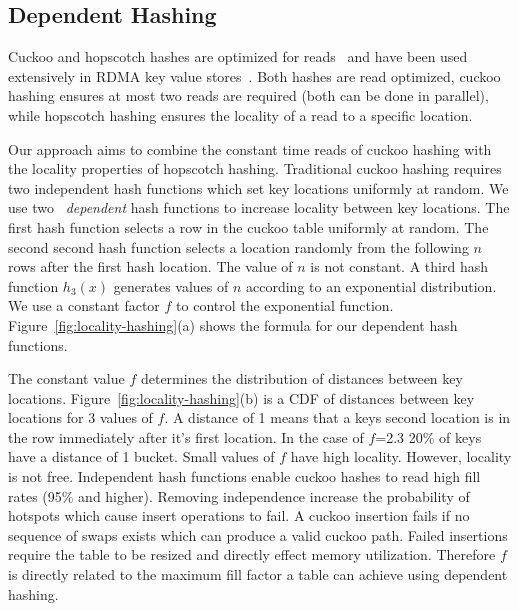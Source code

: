 \subsection{Dependent Hashing}

Cuckoo and hopscotch hashes are optimized for
reads~\cite{cuckoo,hopscotch} and have been used extensively
in RDMA key value
stores~\cite{memc3,cuckoo-improvements,pilaf,farm}. Both
hashes are read optimized, cuckoo hashing ensures at most
two reads are required (both can be done in parallel), while
hopscotch hashing ensures the locality of a read to a
specific location.

Our approach aims to combine the constant time reads of
cuckoo hashing with the locality properties of hopscotch
hashing. Traditional cuckoo hashing requires two independent
hash functions which set key locations uniformly at random.
We use two ~\textit{dependent} hash functions to increase
locality between key locations. The first hash function
selects a row in the cuckoo table uniformly at random. The
second second hash function selects a location randomly from
the following $n$ rows after the first hash location. The
value of $n$ is not constant. A third hash function $h_3(x)$
generates values of $n$ according to an exponential
distribution. We use a constant factor $f$ to control the
exponential function.  Figure~\ref{fig:locality-hashing}(a)
shows the formula for our dependent hash functions.

The constant value $f$ determines the distribution of
distances between key locations.
Figure~\ref{fig:locality-hashing}(b) is a CDF of distances
between key locations for 3 values of $f$. A distance of 1
means that a keys second location is in the row immediately
after it's first location. In the case of $f$=2.3 20\% of
keys have a distance of 1 bucket. Small values of $f$ have
high locality. However, locality is not free. Independent%
hash functions enable cuckoo hashes to read high fill rates (95\% and higher).
Removing independence increase the probability of
hotspots which cause insert operations to fail. A cuckoo
insertion fails if no sequence of swaps exists which can
produce a valid cuckoo path. Failed insertions require the
table to be resized and directly effect memory utilization.
Therefore $f$ is directly related to the maximum fill factor
a table can achieve using dependent hashing.


